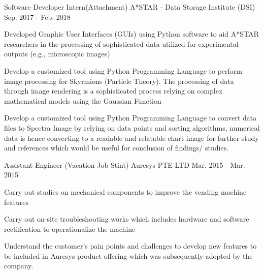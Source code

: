 \begin{cventries}
  \cventry
    {Software Developer Intern(Attachment)} %
    {A*STAR - Data Storage Institute (DSI)} %
    {Sep. 2017 - Feb. 2018} %
    {} %
    {
      \begin{cvitems} %
        \item {Developed Graphic User Interfaces (GUIs) using Python software to aid A*STAR researchers in the processing of sophisticated data utilized for experimental outputs (e.g., microscopic images)}
        \item {Develop a customized tool using Python Programming Language to perform image processing for Skyrmions (Particle Theory). The processing of data through image rendering is a sophisticated process relying on complex mathematical models using the Gaussian Function}
        \item{Develop a customized tool using Python Programming Language to convert data files to Spectra Image by relying on data points and sorting algorithms, numerical data is hence converting to a readable and relatable chart image for further study and references which would be useful for conclusion of findings/ studies.}
      \end{cvitems}
    }
    
  \cventry
    {Assistant Engineer (Vacation Job Stint) } %
    {Auresys PTE LTD} %
    {Mar. 2015 - Mar. 2015} %
    {} %
    {
      \begin{cvitems} %
        \item {Carry out studies on mechanical components to improve the vending machine features}
        \item {Carry out on-site troubleshooting works which includes hardware and software rectification to operationalize the machine}
        \item{Understand the customer’s pain points and challenges to develop new features to be included in Auresys product offering which was subsequently adopted by the company. }
      \end{cvitems}
    }
\end{cventries}
